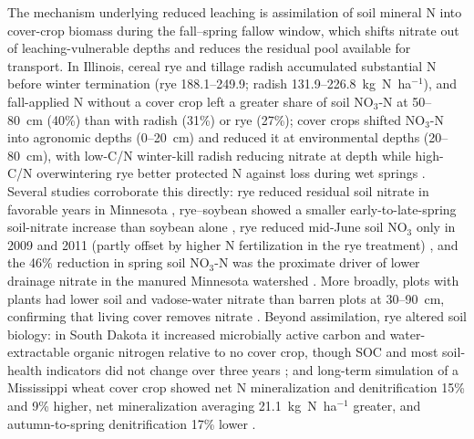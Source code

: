 \documentclass[11pt]{article}
\begin{document}
The mechanism underlying reduced leaching is assimilation of soil mineral N into cover-crop biomass during the fall--spring fallow window, which shifts nitrate out of leaching-vulnerable depths and reduces the residual pool available for transport. In Illinois, cereal rye and tillage radish accumulated substantial N before winter termination (rye 188.1--249.9; radish 131.9--226.8~kg~N~ha$^{-1}$), and fall-applied N without a cover crop left a greater share of soil NO$_3$-N at 50--80~cm (40\%) than with radish (31\%) or rye (27\%); cover crops shifted NO$_3$-N into agronomic depths (0--20~cm) and reduced it at environmental depths (20--80~cm), with low-C/N winter-kill radish reducing nitrate at depth while high-C/N overwintering rye better protected N against loss during wet springs \parencite{Lacey2015}. Several studies corroborate this directly: rye reduced residual soil nitrate in favorable years in Minnesota \parencite{Strock2004}, rye--soybean showed a smaller early-to-late-spring soil-nitrate increase than soybean alone \parencite{Qi2011b}, rye reduced mid-June soil NO$_3$ only in 2009 and 2011 (partly offset by higher N fertilization in the rye treatment) \parencite{MartinezFeria2016}, and the 46\% reduction in spring soil NO$_3$-N was the proximate driver of lower drainage nitrate in the manured Minnesota watershed \parencite{Krueger2013}. More broadly, plots with plants had lower soil and vadose-water nitrate than barren plots at 30--90~cm, confirming that living cover removes nitrate \parencite{Bosompemaa2021}. Beyond assimilation, rye altered soil biology: in South Dakota it increased microbially active carbon and water-extractable organic nitrogen relative to no cover crop, though SOC and most soil-health indicators did not change over three years \parencite{Bawa2023}; and long-term simulation of a Mississippi wheat cover crop showed net N mineralization and denitrification 15\% and 9\% higher, net mineralization averaging 21.1~kg~N~ha$^{-1}$ greater, and autumn-to-spring denitrification 17\% lower \parencite{Yang2021}.
\end{document}
